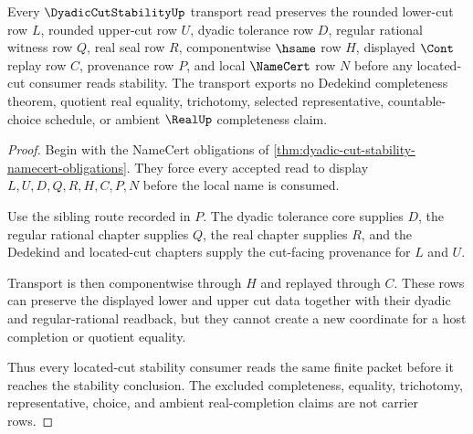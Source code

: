 \begin{theorem}
\label{thm:dyadic-cut-stability-transport}
Every $\DyadicCutStabilityUp$ transport read preserves the rounded lower-cut row $L$, rounded upper-cut row $U$, dyadic tolerance row $D$, regular rational witness row $Q$, real seal row $R$, componentwise $\hsame$ row $H$, displayed $\Cont$ replay row $C$, provenance row $P$, and local $\NameCert$ row $N$ before any located-cut consumer reads stability. The transport exports no Dedekind completeness theorem, quotient real equality, trichotomy, selected representative, countable-choice schedule, or ambient $\RealUp$ completeness claim.
\end{theorem}
\begin{proof}
Begin with the NameCert obligations of \autoref{thm:dyadic-cut-stability-namecert-obligations}. They force every accepted read to display $L,U,D,Q,R,H,C,P,N$ before the local name is consumed.

Use the sibling route recorded in $P$. The dyadic tolerance core supplies $D$, the regular rational chapter supplies $Q$, the real chapter supplies $R$, and the Dedekind and located-cut chapters supply the cut-facing provenance for $L$ and $U$.

Transport is then componentwise through $H$ and replayed through $C$. These rows can preserve the displayed lower and upper cut data together with their dyadic and regular-rational readback, but they cannot create a new coordinate for a host completion or quotient equality.

Thus every located-cut stability consumer reads the same finite packet before it reaches the stability conclusion. The excluded completeness, equality, trichotomy, representative, choice, and ambient real-completion claims are not carrier rows.
\end{proof}



